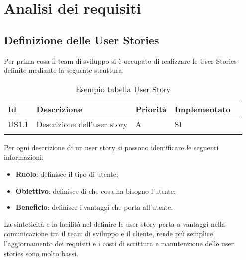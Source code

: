 
\chapter{Analisi dei requisiti}
\label{cap:analisi-requisiti}
\section{Definizione delle User Stories}
Per prima cosa il team di sviluppo si è occupato di realizzare le User Stories definite mediante la seguente struttura.
\begin{longtable} {
		|>{}p{10mm}| 
		|>{}p{70mm}|
		|>{}p{15mm}|
		|>{}p{25mm}|
		>{}p{0mm}}
	\hline
	\textbf{Id} & \textbf{Descrizione} & \textbf{Priorità} & \textbf{Implementato} \\ \hline
	US1.1 & Descrizione dell'user story & A & SI \\ \hline
	\hline
	\caption{Esempio tabella User Story}
\end{longtable}
\noindent
Per ogni descrizione di un user story si possono identificare le seguenti informazioni:
\begin{itemize}
	\item \textbf{Ruolo}: definisce il tipo di utente;
	\item \textbf{Obiettivo}: definisce di che cosa ha bisogno l'utente;
	\item \textbf{Beneficio}: definisce i vantaggi che porta all'utente.
\end{itemize} 
\noindent
La sinteticità e la facilità nel definire le user story porta a vantaggi nella comunicazione tra il team di sviluppo e il cliente, rende più semplice l'aggiornamento dei requisiti e i costi di scrittura e manutenzione delle user stories sono molto bassi.

